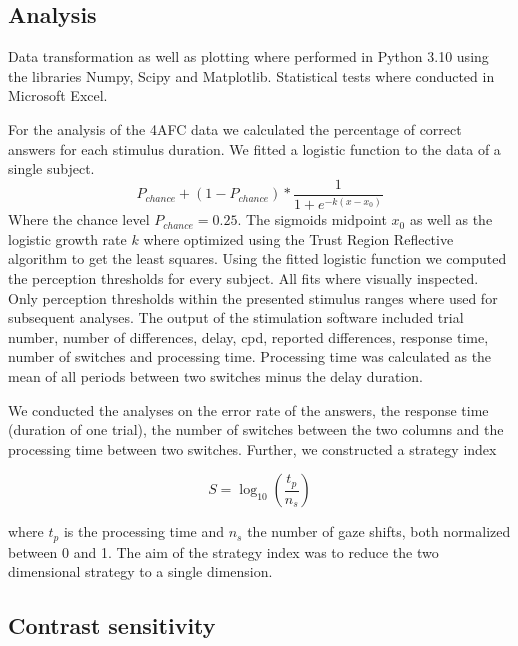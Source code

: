 \vspace{5mm}
\subsection{Analysis}
Data transformation as well as plotting where performed in Python 3.10 using the libraries Numpy, Scipy and Matplotlib. Statistical tests where conducted in Microsoft Excel. 

For the analysis of the 4AFC data we calculated the percentage of correct answers for each stimulus duration. We fitted a logistic function to the data of a single subject.
$$
P_{chance} + (1-P_{chance}) * \frac{1}{1+e^{-k(x -x_{0})}}
$$
Where the chance level $P_{chance} = 0.25$. The sigmoids midpoint $x_{0}$ as well as the logistic growth rate $k$ where optimized using the Trust Region Reflective algorithm to get the least squares. Using the fitted logistic function we computed the perception thresholds for every subject. All fits where visually inspected. Only perception thresholds within the presented stimulus ranges where used for subsequent analyses. The output of the stimulation software included trial number, number of differences, delay, cpd, reported differences, response time, number of switches and processing time. Processing time was calculated as the mean of all periods between two switches minus the delay duration.  

We conducted the analyses on the error rate of the answers, the response time (duration of one trial), the number of switches between the two columns and the processing time between two switches. Further, we constructed a strategy index

$$
S = \log_{10} \left( \frac{t_{p}}{n_{s}} \right)
$$

where $t_p$ is the processing time and $n_s$ the number of gaze shifts, both normalized between 0 and 1. The aim of the strategy index was to reduce the two dimensional strategy to a single dimension.

\vspace{5mm}
\subsection{Contrast sensitivity}

